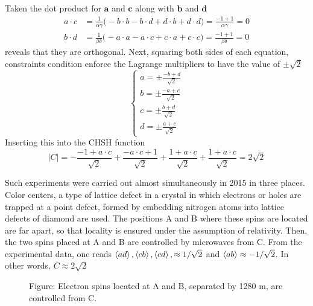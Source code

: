 \documentclass[../../../main.tex]{subfiles}
\begin{document}
Taken the dot product for $\mathbf{a}$ and $\mathbf{c}$ along with $\mathbf{b } $ and $\mathbf{d}$
\begin{align*}
  a\cdot c
   & =   \frac{1}{\alpha\gamma}\big(-b\cdot b - b\cdot d + d\cdot b + d\cdot d\big)
  = \frac{-1+1}{\alpha\gamma}=0                                                     \\
  b\cdot d
   & =   \frac{1}{\beta\delta}\big(-a\cdot a - a\cdot c + c\cdot a + c\cdot c\big)
  = \frac{-1+1}{\beta\delta}=0
\end{align*}
reveals that they are orthogonal.
Next, squaring both sides of each equation, constraints condition enforce the Lagrange multipliers to have the value of $\pm\sqrt{2}$
\begin{equation*}
  \begin{cases}
    a = \pm\frac{-b+d}{\sqrt{2}} \\
    b = \pm\frac{-a+c}{\sqrt{2}} \\
    c = \pm\frac{b+d}{\sqrt{2}}  \\
    d = \pm\frac{a+c}{\sqrt{2}}
  \end{cases}
\end{equation*}
Inserting this into the CHSH function
\begin{equation*}
  |C| =
  - \frac{-1 + a\cdot c}{\sqrt{2}} + \frac{-a\cdot c + 1}{\sqrt{2}} + \frac{1 + a\cdot c}{\sqrt{2}} + \frac{1 + a\cdot c}{\sqrt{2}}
  = 2 \sqrt{2}
\end{equation*}

Such experiments were carried out almost simultaneously in 2015 in three places.
Color centers, a type of lattice defect in a crystal in which electrons or holes are trapped at a point defect, formed by embedding nitrogen atoms into lattice defects of diamond are used.
The positions A and B where these spins are located are far apart, so that locality is ensured under the assumption of relativity.
Then, the two spins placed at A and B are controlled by microwaves from C.
From the experimental data, one reads $\braket{ad } , \braket{cb }, \braket{cd }, \approx 1/\sqrt{2}$ and $\braket{ab }\approx -1/\sqrt{2}$.
In other words, $C \approx 2 \sqrt{2}$
\begin{figure}
  \centering
  \caption*{Figure: Electron spins located at A and B, separated by 1280 m, are controlled from C.}
\end{figure}
\end{document}
